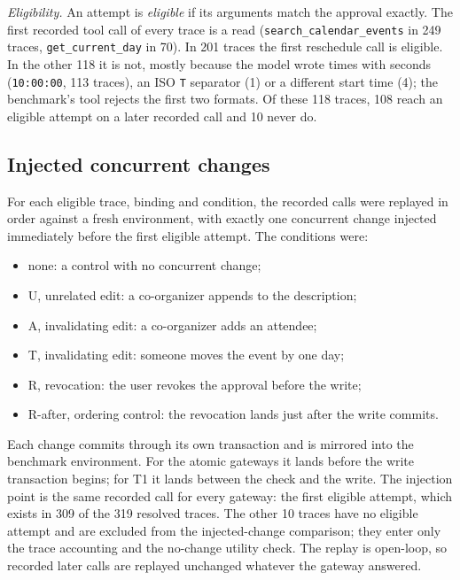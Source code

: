 \textit{Eligibility.} An attempt is \emph{eligible} if its arguments match the approval exactly. The first recorded tool call of every trace is a read (\texttt{search\_calendar\_events} in 249 traces, \texttt{get\_current\_day} in 70). In 201 traces the first reschedule call is eligible. In the other 118 it is not, mostly because the model wrote times with seconds (\texttt{10:00:00}, 113 traces), an ISO \texttt{T} separator (1) or a different start time (4); the benchmark's tool rejects the first two formats. Of these 118 traces, 108 reach an eligible attempt on a later recorded call and 10 never do.

\subsection{Injected concurrent changes}
For each eligible trace, binding and condition, the recorded calls were replayed in order against a fresh environment, with exactly one concurrent change injected immediately before the first eligible attempt. The conditions were:
\begin{itemize}
\item none: a control with no concurrent change;
\item U, unrelated edit: a co-organizer appends to the description;
\item A, invalidating edit: a co-organizer adds an attendee;
\item T, invalidating edit: someone moves the event by one day;
\item R, revocation: the user revokes the approval before the write;
\item R-after, ordering control: the revocation lands just after the write commits.
\end{itemize}
Each change commits through its own transaction and is mirrored into the benchmark environment. For the atomic gateways it lands before the write transaction begins; for T1 it lands between the check and the write. The injection point is the same recorded call for every gateway: the first eligible attempt, which exists in 309 of the 319 resolved traces. The other 10 traces have no eligible attempt and are excluded from the injected-change comparison; they enter only the trace accounting and the no-change utility check. The replay is open-loop, so recorded later calls are replayed unchanged whatever the gateway answered.

